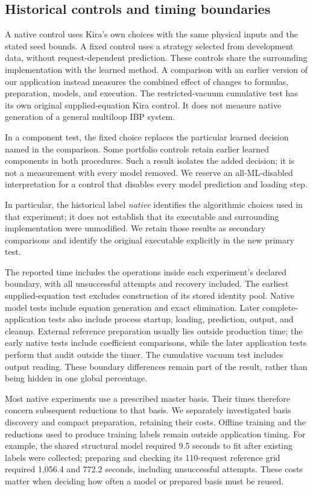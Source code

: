 \subsection{Historical controls and timing boundaries}
A native control uses Kira's own choices with the same physical inputs and the stated seed bounds. A fixed control uses a strategy selected from development data, without request-dependent prediction. These controls share the surrounding implementation with the learned method. A comparison with an earlier version of our application instead measures the combined effect of changes to formulas, preparation, models, and execution. The restricted-vacuum cumulative test has its own original supplied-equation Kira control. It does not measure native generation of a general multiloop IBP system.

In a component test, the fixed choice replaces the particular learned decision named in the comparison. Some portfolio controls retain earlier learned components in both procedures. Such a result isolates the added decision; it is not a measurement with every model removed. We reserve an all-ML-disabled interpretation for a control that disables every model prediction and loading step.

In particular, the historical label \emph{native} identifies the algorithmic choices used in that experiment; it does not establish that its executable and surrounding implementation were unmodified. We retain those results as secondary comparisons and identify the original executable explicitly in the new primary test.

The reported time includes the operations inside each experiment's declared boundary, with all unsuccessful attempts and recovery included. The earliest supplied-equation test excludes construction of its stored identity pool. Native model tests include equation generation and exact elimination. Later complete-application tests also include process startup, loading, prediction, output, and cleanup. External reference preparation usually lies outside production time; the early native tests include coefficient comparisons, while the later application tests perform that audit outside the timer. The cumulative vacuum test includes output reading. These boundary differences remain part of the result, rather than being hidden in one global percentage.

Most native experiments use a prescribed master basis. Their times therefore concern subsequent reductions to that basis. We separately investigated basis discovery and compact preparation, retaining their costs. Offline training and the reductions used to produce training labels remain outside application timing. For example, the shared structural model required 9.5 seconds to fit after existing labels were collected; preparing and checking its 110-request reference grid required 1,056.4 and 772.2 seconds, including unsuccessful attempts. These costs matter when deciding how often a model or prepared basis must be reused.

